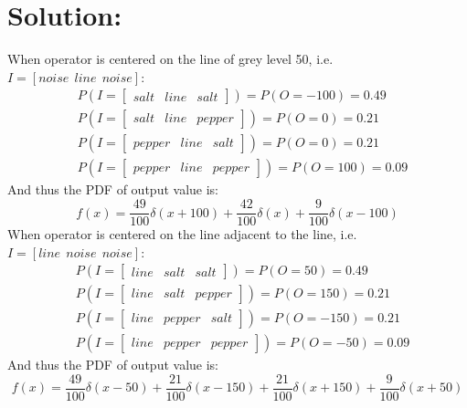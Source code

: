 \documentclass[12pt]{article}
\begin{document}
\section{Solution:}
When operator is centered on the line of grey level 50, i.e. $I = [noise\ \ line\ \ noise]$:
\begin{equation*}
\begin{aligned}
&P(I = \left[ \begin{array}{ccc}
salt & line & salt
\end{array} \right]) = P(O = -100) = 0.49\\
&P(I = \left[ \begin{array}{ccc}
salt & line & pepper
\end{array} \right]) = P(O = 0) = 0.21\\
&P(I = \left[ \begin{array}{ccc}
pepper & line & salt
\end{array} \right]) = P(O = 0) = 0.21\\
&P(I = \left[ \begin{array}{ccc}
pepper & line & pepper
\end{array} \right]) = P(O = 100) = 0.09
\end{aligned}
\end{equation*}
And thus the PDF of output value is:
\begin{equation*}
    f(x) = \frac{49}{100}\delta(x+100) + \frac{42}{100}\delta(x) + \frac{9}{100}\delta(x-100)
\end{equation*}
When operator is centered on the line adjacent to the line, i.e. $I = [line\ \ noise\ \ noise]$:
\begin{equation*}
\begin{aligned}
&P(I = \left[ \begin{array}{ccc}
line & salt & salt
\end{array} \right]) = P(O = 50) = 0.49\\
&P(I = \left[ \begin{array}{ccc}
line & salt & pepper
\end{array} \right]) = P(O = 150) = 0.21\\
&P(I = \left[ \begin{array}{ccc}
line & pepper & salt
\end{array} \right]) = P(O = -150) = 0.21\\
&P(I = \left[ \begin{array}{ccc}
line & pepper & pepper
\end{array} \right]) = P(O = -50) = 0.09
\end{aligned}
\end{equation*}
And thus the PDF of output value is:
\begin{equation*}
    f(x) = \frac{49}{100}\delta(x-50) + \frac{21}{100}\delta(x-150) + \frac{21}{100}\delta(x+150) + \frac{9}{100}\delta(x+50)
\end{equation*}
\end{document}
